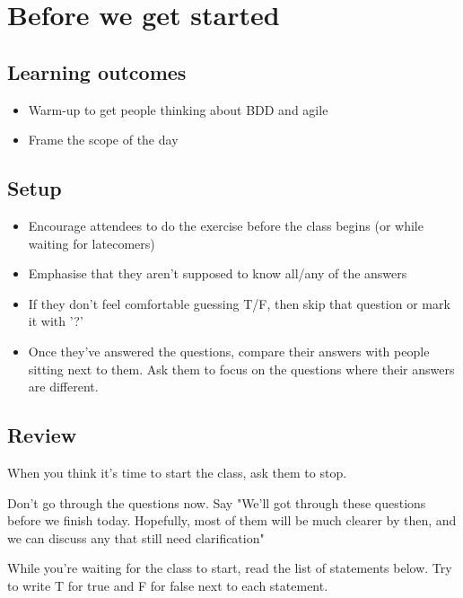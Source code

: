 \chapter*{Before we get started}

\ifnotes
    
    \section*{Learning outcomes}
    
    \begin{itemize}
        \item Warm-up to get people thinking about BDD and agile
        \item Frame the scope of the day
    \end{itemize}
    
    \section*{Setup}
    
    \begin{itemize}
        \item Encourage attendees to do the exercise before the class begins (or while waiting for latecomers)
        \item Emphasise that they aren't supposed to know all/any of the answers
        \item If they don't feel comfortable guessing T/F, then skip that question or mark it with '?'
        \item Once they've answered the questions, compare their answers with people sitting next to them. Ask them to focus on the questions where their answers are different.
    \end{itemize}

    \section*{Review}
    
    When you think it's time to start the class, ask them to stop. 
    
    Don't go through the questions now. Say "We'll got through these questions before we finish today. Hopefully, most of them will be much clearer by then, and we can discuss any that still need clarification"
\fi

\ifcontent
    While you're waiting for the class to start, read the list of statements below. Try to write T for true and F for false next to each statement.
    
